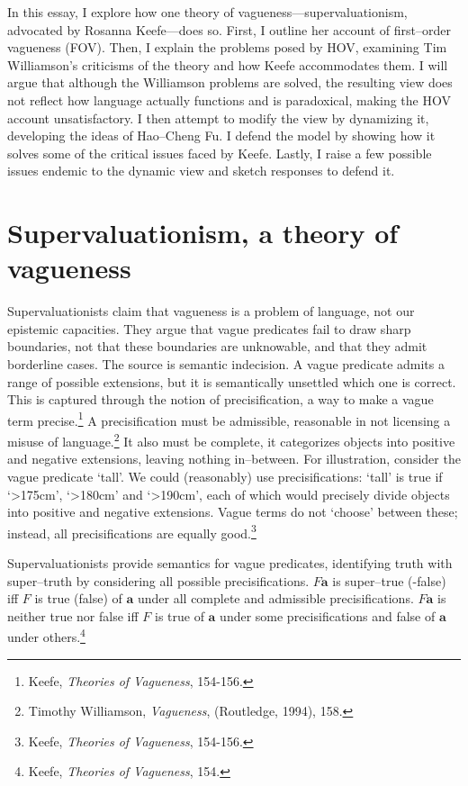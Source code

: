In this essay, I explore how one theory of vagueness---supervaluationism, advocated by Rosanna Keefe---does so. First, I
outline her account of first--order vagueness (FOV). Then, I explain the
problems posed by HOV, examining Tim Williamson's criticisms of the
theory and how Keefe accommodates them. I will argue that although the
Williamson problems are solved, the resulting view does not reflect how
language actually functions and is paradoxical, making the HOV account
unsatisfactory. I then attempt to modify the view by dynamizing it,
developing the ideas of Hao--Cheng Fu. I defend the model by showing how
it solves some of the critical issues faced by Keefe. Lastly, I raise a
few possible issues endemic to the dynamic view and sketch responses to
defend it.

\section{Supervaluationism, a theory of vagueness}

Supervaluationists claim that vagueness is a problem of language, not
our epistemic capacities. They argue that vague predicates fail to draw
sharp boundaries, not that these boundaries are unknowable, and that
they admit borderline cases. The source is semantic indecision. A vague
predicate admits a range of possible extensions, but it is semantically
unsettled which one is correct. This is captured through the notion of
precisification, a way to make a vague term precise.\footnote{Keefe,
  \emph{Theories of Vagueness}, 154-156.} A precisification must be
admissible, reasonable in not licensing a misuse of language.\footnote{Timothy
  Williamson, \emph{Vagueness}, (Routledge, 1994), 158.} It also must be
complete, it categorizes objects into positive and negative extensions,
leaving nothing in--between. For illustration, consider the vague
predicate `tall'. We could (reasonably) use precisifications: `tall' is
true if `\textgreater175cm', `\textgreater180cm' and
`\textgreater190cm', each of which would precisely divide objects into
positive and negative extensions. Vague terms do not `choose' between
these; instead, all precisifications are equally good.\footnote{Keefe,
  \emph{Theories of Vagueness}, 154-156.}

Supervaluationists provide semantics for vague predicates, identifying
truth with super--truth by considering all possible precisifications.
$F\mathbf{a}$ is super--true (-false) iff $F$ is true (false) of
$\mathbf{a}$ under all complete and admissible precisifications.
$F\mathbf{a}$ is neither true nor false iff $F$ is true of
$\mathbf{a}$ under some precisifications and false of $\mathbf{a}$ under
others.\footnote{Keefe, \emph{Theories of Vagueness}, 154.}

